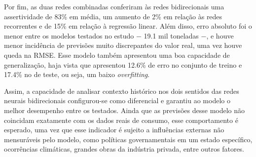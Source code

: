 Por fim, as duas redes combinadas conferiram às redes bidirecionais uma 
assertividade de 83\% em média, um aumento de 2\% em relação às redes recorrentes e de
15\% em relação à regressão linear. Além disso, erro absoluto foi o menor entre 
os modelos testados no estudo $-$ 19.1 mil toneladas $-$, e houve menor 
incidência de previsões muito discrepantes do valor real, uma vez houve queda
na RMSE. Esse modelo também apresentou uma boa capacidade de generalização, 
haja vista que apresentou 12.6\% de erro no conjunto de treino e 17.4\% no de teste,
ou seja, um baixo \textit{overfitting}.

Assim, a capacidade de analisar contexto histórico nos dois sentidos das redes
neurais bidirecionais configurou-se como diferencial e garantiu ao modelo o 
melhor desempenho entre os testados. Ainda que as previsões desse modelo 
não coincidam exatamente com os dados reais de consumo, esse comportamento é 
esperado, uma vez que esse indicador é sujeito a 
influências externas não mensuráveis pelo modelo, como políticas governamentais
em um estado específico, ocorrências climáticas, grandes obras da indústria
privada, entre outros fatores.


